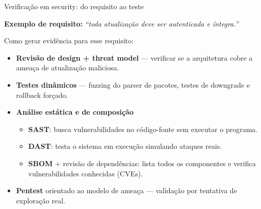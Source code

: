 \documentclass{beamer}
\begin{document}
\begin{frame}{Verificação em security: do requisito ao teste}

\textbf{Exemplo de requisito:} \textit{“toda atualização deve ser autenticada e íntegra.”}

\vspace{0.5em}
Como gerar evidência para esse requisito:

\vspace{0.3em}
\begin{itemize}
  \item \textbf{Revisão de design + threat model} — verificar se a arquitetura cobre a ameaça de atualização maliciosa.

  \vspace{0.2em}
  \item \textbf{Testes dinâmicos} — fuzzing do parser de pacotes, testes de downgrade e rollback forçado.

  \vspace{0.2em}
  \item \textbf{Análise estática e de composição}
  \begin{itemize}
    \item \textbf{SAST}: busca vulnerabilidades no código-fonte sem executar o programa.
    \item \textbf{DAST}: testa o sistema em execução simulando ataques reais.
    \item \textbf{SBOM} + revisão de dependências: lista todos os componentes e verifica vulnerabilidades conhecidas (CVEs).
  \end{itemize}

  \vspace{0.2em}
  \item \textbf{Pentest} orientado ao modelo de ameaça — validação por tentativa de exploração real.
\end{itemize}

\end{frame}
\end{document}

